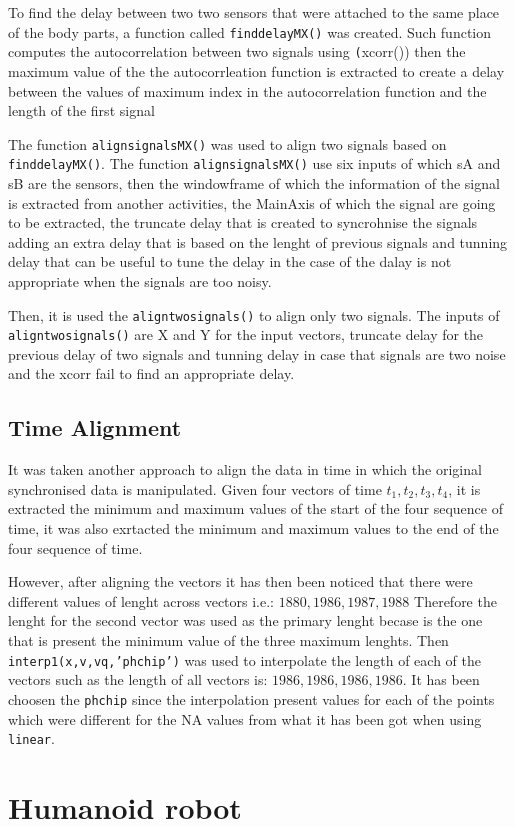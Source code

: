 To find the delay between two two sensors that were attached to the same place
of the body parts, a function called  \texttt{finddelayMX()} was created.
Such function computes the autocorrelation between two signals using \texttt(xcorr())
then the maximum value of the the autocorrleation function is extracted
to create a delay between the values of maximum index in the autocorrelation
function and the length of the first signal


The function \texttt{alignsignalsMX()} was used to align two signals based
on \texttt{finddelayMX()}. The function \texttt{alignsignalsMX()} use six inputs
of which sA and sB are the sensors, then the windowframe of which the information
of the signal is extracted from another activities, the MainAxis of which the
signal are going to be extracted, the truncate delay that is created to
syncrohnise the signals adding an extra delay that is based on the lenght of
previous signals and tunning delay that can be useful to tune the delay in the
case of the dalay is not appropriate when the signals are too noisy.

Then, it is used the \texttt{aligntwosignals()} to align only two signals.
The inputs of \texttt{aligntwosignals()} are X and Y for the input vectors,
truncate delay for the previous delay of two signals and tunning delay
in case that signals are two noise and the xcorr fail to find an appropriate
delay.

\subsection{Time Alignment}
It was taken another approach to align the data in time in which the
original synchronised data is manipulated. Given four vectors of time
$t_1, t_2, t_3, t_4$, it is extracted the minimum and maximum values
of the start of the four sequence of time,
it was also exrtacted the minimum and maximum values to the
end of the four sequence of time.

However, after aligning the vectors it has then  been noticed that there were
different values of lenght across vectors i.e.: $1880,1986,1987,1988$
Therefore the lenght for the second vector was used as the primary lenght
becase is the one that is present the minimum value of the three maximum
lenghts. Then \texttt{interp1(x,v,vq,'phchip')}  was used to interpolate the
length of each of the vectors such as the length of all vectors is: $1986,1986,1986,1986$.
It has been choosen the \texttt{phchip} since the interpolation present
values for each of the points which were different for the NA values
from what it has been got when using \texttt{linear}.


\section{Humanoid robot}  \label{appendix:nao}

